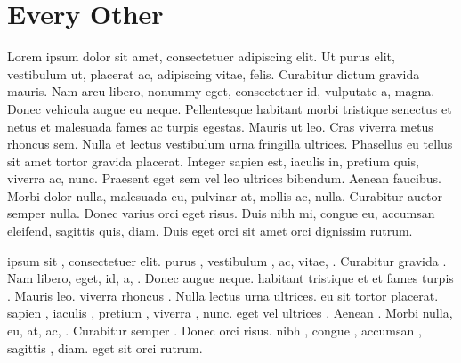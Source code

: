 \documentclass{article}
\begin{document}
\section{Every Other}

\begin{minipage}[t]{.5\textwidth}
Lorem ipsum dolor sit amet, consectetuer adipiscing elit. Ut purus
elit, vestibulum ut, placerat ac, adipiscing vitae, felis. Curabitur
dictum gravida mauris. Nam arcu libero, nonummy eget, consectetuer
id, vulputate a, magna. Donec vehicula augue eu neque. Pellentesque
habitant morbi tristique senectus et netus et malesuada fames ac
turpis egestas. Mauris ut leo. Cras viverra metus rhoncus sem. Nulla
et lectus vestibulum urna fringilla ultrices. Phasellus eu tellus
sit amet tortor gravida placerat. Integer sapien est, iaculis in,
pretium quis, viverra ac, nunc. Praesent eget sem vel leo ultrices
bibendum. Aenean faucibus. Morbi dolor nulla, malesuada eu, pulvinar
at, mollis ac, nulla. Curabitur auctor semper nulla.  Donec varius orci
eget risus. Duis nibh mi, congue eu, accumsan eleifend, sagittis quis,
diam. Duis eget orci sit amet orci dignissim rutrum.
\end{minipage}
\begin{minipage}[t]{.5\textwidth}
 ipsum  sit ,
consectetuer  elit.  purus
, vestibulum , 
ac,  vitae, . Curabitur
 gravida . Nam 
libero,  eget, 
id,  a, . Donec
 augue  neque. 
habitant  tristique  et
 et  fames  turpis
. Mauris  leo. 
viverra  rhoncus . Nulla 
lectus  urna  ultrices.
 eu  sit  tortor
 placerat.  sapien ,
iaculis , pretium , viverra ,
nunc.  eget  vel 
ultrices . Aenean . Morbi
 nulla,  eu, 
at,  ac, . Curabitur 
semper .  Donec  orci 
risus.  nibh , congue ,
accumsan , sagittis , diam.
 eget  sit  orci
 rutrum.
\end{minipage}
\end{document}
